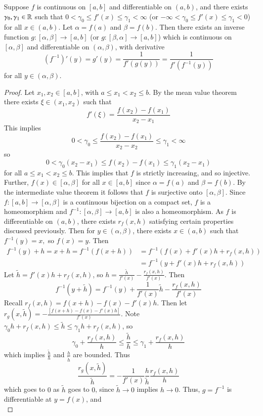 \begin{subappendices}
    \begin{namthm}
        Suppose $f$ is continuous on $[a,b]$ and differentiable on $(a,b)$, and there exists $\gamma_0,\gamma_1 \in \mathbb R$ such that $0 < \gamma_0 \leq f'(x) \leq \gamma_1 < \infty$ (or $-\infty < \gamma_0 \leq f'(x) \leq \gamma_1 < 0$) for all $x \in (a,b)$. Let $\alpha = f(a)$ and $\beta = f(b)$. Then there exists an inverse function $g:[\alpha,\beta]\rightarrow [a,b]$ (or $g:[\beta,\alpha]\rightarrow[a,b]$) which is continuous on $[\alpha,\beta]$ and differentiable on $(\alpha,\beta)$, with derivative \begin{equation*}
            (f^{-1})'(y) = g'(y) = \frac{1}{f'(g(y))} = \frac{1}{f'(f^{-1}(y))}
        \end{equation*}
        for all $y \in (\alpha,\beta)$.
    \end{namthm}
    \begin{proof}
        Let $x_1,x_2 \in [a,b]$, with $a \leq x_1 < x_2 \leq b$. By the mean value theorem there exists $\xi \in (x_1,x_2)$ such that $$f'(\xi) = \frac{f(x_2) - f(x_1)}{x_2-x_1}$$ This implies $$0 < \gamma_0 \leq \frac{f(x_2) - f(x_1)}{x_2-x_2} \leq \gamma_1 < \infty$$ so $$0<\gamma_0(x_2-x_1) \leq f(x_2) - f(x_1) \leq \gamma_1(x_2-x_1)$$ for all $a \leq x_1 < x_2 \leq b$. This implies that $f$ is strictly increasing, and so injective. Further, $f(x) \in [\alpha,\beta]$ for all $x \in [a,b]$ since $\alpha = f(a)$ and $\beta = f(b)$. By the intermediate value theorem it follows that $f$ is surjective onto $[\alpha,\beta]$. Since $f:[a,b]\rightarrow [\alpha,\beta]$ is a continuous bijection on a compact set, $f$ is a homeomorphism and $f^{-1}:[\alpha,\beta]\rightarrow [a,b]$ is also a homeomorphism. As $f$ is differentiable on $(a,b)$, there exists $r_f(x,h)$ satisfying certain properties discussed previously. Then for $y \in (\alpha,\beta)$, there exists $x \in (a,b)$ such that $f^{-1}(y) = x,$ so $f(x) = y$. Then \begin{align*}
            f^{-1}(y) + h = x+h = f^{-1}(f(x+h)) &= f^{-1}(f(x)+f'(x)h+r_f(x,h)) \\
            &= f^{-1}(y+f'(x)h+r_f(x,h))
        \end{align*}
        Let $\tilde{h} = f'(x)h+r_f(x,h)$, so $h = \frac{\tilde{h}}{f'(x)} - \frac{r_f(x,h)}{f'(x)}$. Then \begin{equation*}
            f^{-1}(y+\tilde{h}) = f^{-1}(y) + \frac{1}{f'(x)}\tilde{h} - \frac{r_f(x,h)}{f'(x)}
        \end{equation*}
        Recall $r_f(x,h) = f(x+h) - f(x) - f'(x)h$. Then let $r_g(x,\tilde{h}) = -\frac{[f(x+h) - f(x) - f'(x)h]}{f'(x)}$. Note $\gamma_0h + r_f(x,h) \leq \tilde{h} \leq \gamma_1 h + r_f(x,h)$, so $$\gamma_0+\frac{r_f(x,h)}{h} \leq \frac{\tilde{h}}{h} \leq \gamma_1 + \frac{r_f(x,h)}{h}$$ which implies $\frac{\tilde{h}}{h}$ and $\frac{h}{\tilde{h}}$ are bounded. Thus $$\frac{r_g(x,\tilde{h})}{\tilde{h}} = -\frac{1}{f'(x)}\frac{h}{\tilde{h}}\frac{r_f(x,h)}{h}$$ which goes to $0$ as $\tilde{h}$ goes to $0$, since $\tilde{h}\rightarrow 0$ implies $h\rightarrow 0$. Thus, $g=f^{-1}$ is differentiable at $y = f(x)$, and \begin{equation*}

\end{equation*}
\end{proof}
\end{subappendices}
